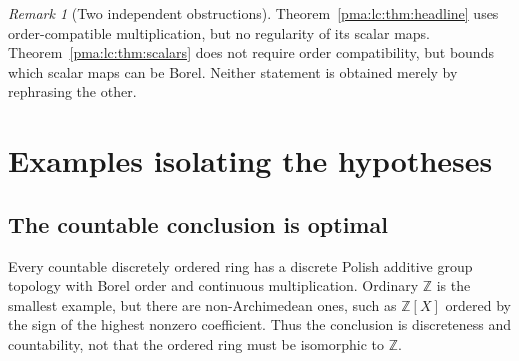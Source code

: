 \documentclass[11pt]{article}
\numberwithin{equation}{section}
\theoremstyle{definition}
\theoremstyle{remark}
\newtheorem{remark}[remark]{Remark}
\newcommand{\Z}{\mathbb Z}
\begin{document}
\begin{remark}[Two independent obstructions]
Theorem~\ref{pma:lc:thm:headline} uses order-compatible multiplication, but no
regularity of its scalar maps. Theorem~\ref{pma:lc:thm:scalars} does not require
order compatibility, but bounds which scalar maps can be Borel. Neither
statement is obtained merely by rephrasing the other.
\end{remark}

\section{Examples isolating the hypotheses}
\label{pma:lc:sec:sharpness}

\subsection{The countable conclusion is optimal}
Every countable discretely ordered ring has a discrete Polish additive
group topology with Borel order and continuous multiplication. Ordinary
$\Z$ is the smallest example, but there are non-Archimedean ones, such
as $\Z[X]$ ordered by the sign of the highest nonzero coefficient.
Thus the conclusion is discreteness and countability, not that the
ordered ring must be isomorphic to $\Z$.
\end{document}
